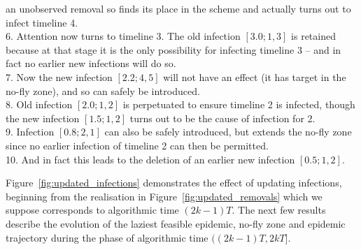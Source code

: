 \documentclass[]{article}
\begin{document}
\begin{Figure}
{an unobserved removal so finds its place in the scheme and actually turns
out to infect timeline 4.
\\6. Attention now turns to timeline 3. The old infection \([3.0;1,3]\)
is retained because at that stage it is the only possibility for infecting timeline 3 -- 
and in fact no earlier new infections will do so.
\\7. Now the new infection \([2.2;4,5]\) will not have an effect
(it has target in the no-fly zone), and so can safely be introduced.
\\8. Old infection \([2.0;1,2]\) is perpetuated to ensure timeline 2
is infected, though the new infection \([1.5;1,2]\) turns out to 
be the cause of infection for 2.
\\9. Infection \([0.8;2,1]\) can also be safely introduced, but extends the 
no-fly zone since no earlier infection of timeline 2 can then be permitted.
\\10. And in fact this leads to the deletion of an earlier new infection
\([0.5;1,2]\).
		\label{fig:updated_infections}} 
\end{Figure}

Figure~\ref{fig:updated_infections} demonstrates the effect of updating infections,
beginning from the realisation in Figure~\ref{fig:updated_removals}
which we suppose corresponds to algorithmic time \((2k{-}1)T\). 
The next few results describe the evolution of the laziest feasible epidemic, 
no-fly zone and epidemic trajectory during the phase of algorithmic time \(((2k{-}1)T, 2kT]\).
\end{document}
